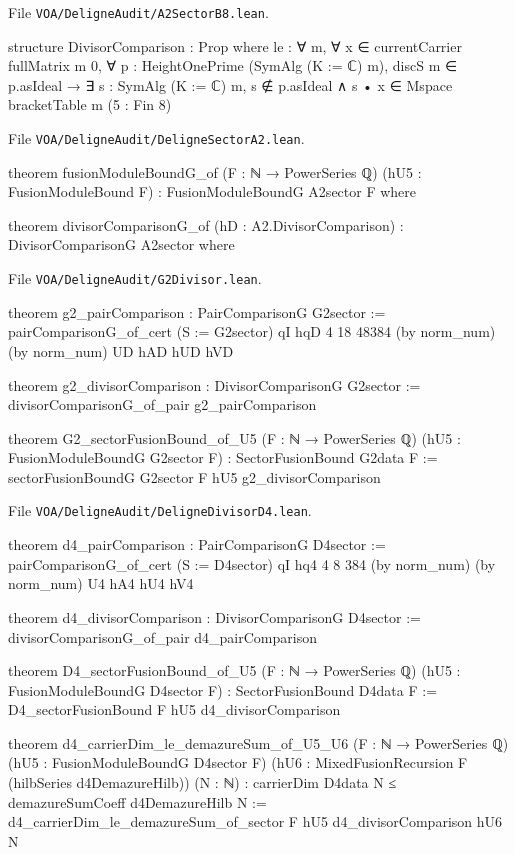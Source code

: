 \documentclass[11pt,openany]{book}
\newcommand{\leanpath}[1]{\texttt{\small #1}}
\theoremstyle{definition}
\theoremstyle{plain}
\begin{document}
{\raggedright\noindent File \leanpath{VOA/\allowbreak DeligneAudit/\allowbreak A2SectorB8.lean}.\par}
\begin{leancode}
structure DivisorComparison : Prop where
  le : ∀ m, ∀ x ∈ currentCarrier fullMatrix m 0, ∀ p : HeightOnePrime (SymAlg (K := ℂ) m),
    discS m ∈ p.asIdeal → ∃ s : SymAlg (K := ℂ) m, s ∉ p.asIdeal ∧
      s • x ∈ Mspace bracketTable m (5 : Fin 8)
\end{leancode}
{\raggedright\noindent File \leanpath{VOA/\allowbreak DeligneAudit/\allowbreak DeligneSectorA2.lean}.\par}
\begin{leancode}
theorem fusionModuleBoundG_of (F : ℕ → PowerSeries ℚ) (hU5 : FusionModuleBound F) :
    FusionModuleBoundG A2sector F where

theorem divisorComparisonG_of (hD : A2.DivisorComparison) : DivisorComparisonG A2sector where
\end{leancode}
{\raggedright\noindent File \leanpath{VOA/\allowbreak DeligneAudit/\allowbreak G2Divisor.lean}.\par}
\begin{leancode}
theorem g2_pairComparison : PairComparisonG G2sector :=
  pairComparisonG_of_cert (S := G2sector) qI hqD 4 18 48384 (by norm_num) (by norm_num) UD hAD hUD hVD

theorem g2_divisorComparison : DivisorComparisonG G2sector :=
  divisorComparisonG_of_pair g2_pairComparison

theorem G2_sectorFusionBound_of_U5 (F : ℕ → PowerSeries ℚ) (hU5 : FusionModuleBoundG G2sector F) :
    SectorFusionBound G2data F :=
  sectorFusionBoundG G2sector F hU5 g2_divisorComparison
\end{leancode}
{\raggedright\noindent File \leanpath{VOA/\allowbreak DeligneAudit/\allowbreak DeligneDivisorD4.lean}.\par}
\begin{leancode}
theorem d4_pairComparison : PairComparisonG D4sector :=
  pairComparisonG_of_cert (S := D4sector) qI hq4 4 8 384 (by norm_num) (by norm_num) U4 hA4 hU4 hV4

theorem d4_divisorComparison : DivisorComparisonG D4sector :=
  divisorComparisonG_of_pair d4_pairComparison

theorem D4_sectorFusionBound_of_U5 (F : ℕ → PowerSeries ℚ) (hU5 : FusionModuleBoundG D4sector F) :
    SectorFusionBound D4data F :=
  D4_sectorFusionBound F hU5 d4_divisorComparison

theorem d4_carrierDim_le_demazureSum_of_U5_U6 (F : ℕ → PowerSeries ℚ)
    (hU5 : FusionModuleBoundG D4sector F)
    (hU6 : MixedFusionRecursion F (hilbSeries d4DemazureHilb)) (N : ℕ) :
    carrierDim D4data N ≤ demazureSumCoeff d4DemazureHilb N :=
  d4_carrierDim_le_demazureSum_of_sector F hU5 d4_divisorComparison hU6 N
\end{leancode}
\end{document}
